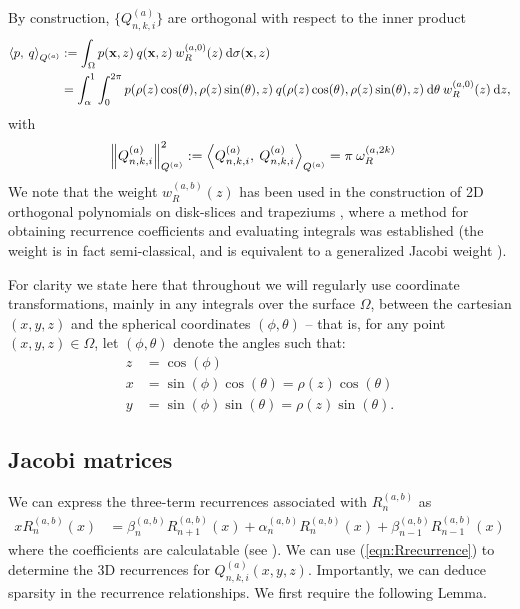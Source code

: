 \documentclass[11pt, oneside]{article}   	%
\newcommand{\genjac}{R}
\newcommand{\genjacw}{w_\genjac}
\newcommand{\normgenjac}{\omega_\genjac}
\newcommand{\scop}{Q}
\newcommand{\scopnki}{\scop_{n,k,i}}
\newcommand{\scopa}{\scop^{(a)}}
\newcommand{\scopnkia}{\scopnki^{(a)}}
\newcommand{\xvec}{\mathbf{x}}
\begin{document}
By construction, $\{\scopnkia\}$ are orthogonal with respect to the inner product
\begin{align}
	\ip< p, \: q >_{\scopa} &:= \int_\Omega p(\xvec, z) \: q(\xvec, z) \: \genjacw^{(a,0)}(z) \: \D \sigma(\xvec, z) \\
	&= \int_\alpha^1 \int_0^{2\pi} p(\rho(z) \cos(\theta), \rho(z) \sin(\theta), z) \: q(\rho(z) \cos(\theta), \rho(z) \sin(\theta), z) \: \D \theta \: \genjacw^{(a,0)}(z) \: \D z,
\end{align}
with
\begin{align}
	\norm{\scopnkia}_{\scopa}^2 &:= \ip< \scopnkia, \: \scopnkia >_{\scopa} = \pi \: \normgenjac^{(a, 2k)} \label{eqn:normscop}
\end{align}
We note that the weight $\genjacw^{(a,b)}(z)$ has been used in the construction of 2D orthogonal polynomials on disk-slices and trapeziums \cite{snowball2019sparse}, where a method for obtaining recurrence coefficients and evaluating integrals was established (the weight is in fact semi-classical, and is equivalent to a generalized Jacobi weight \cite[\S5]{magnus1995painleve}). 

For clarity we state here that throughout we will regularly use coordinate transformations, mainly in any integrals over the surface $\Omega$, between the cartesian $(x,y,z)$ and the spherical coordinates $(\phi, \theta)$ -- that is, for any point $(x,y,z) \in \Omega$, let $(\phi, \theta)$ denote the angles such that:
\begin{align*}
	z &= \cos(\phi) \\
	x &= \sin(\phi) \cos(\theta) = \rho(z) \cos(\theta) \\
	y &= \sin(\phi) \sin(\theta) = \rho(z) \sin(\theta).
\end{align*}


\subsection{Jacobi matrices}\label{subsection:jacobimats}

We can express the three-term recurrences associated with $\genjac_n^{(a,b)}$ as
\begin{align}
	x \genjac_n^{(a,b)}(x) &= \beta_n^{(a,b)} \genjac_{n+1}^{(a,b)}(x) + \alpha_n^{(a,b)} \genjac_n^{(a,b)}(x) + \beta_{n-1}^{(a,b)} \genjac_{n-1}^{(a,b)}(x) \label{eqn:Rrecurrence}
\end{align}
where the coefficients are calculatable (see \cite{snowball2019sparse}). We can use (\ref{eqn:Rrecurrence}) to determine the 3D recurrences for $\scopnkia(x,y,z)$. Importantly, we can deduce sparsity in the recurrence relationships.  We first require the following Lemma.
\end{document}
